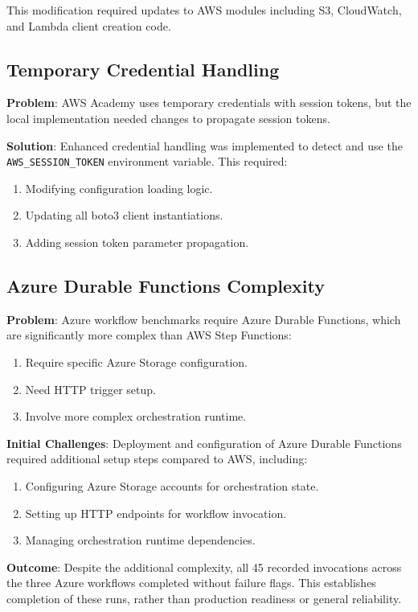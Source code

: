 \documentclass[sigconf,nonacm]{acmart}
\begin{document}
This modification required updates to AWS modules including S3, CloudWatch, and Lambda client creation code.

\subsection{Temporary Credential Handling}

\textbf{Problem}: AWS Academy uses temporary credentials with session tokens, but the local implementation needed changes to propagate session tokens.

\textbf{Solution}: Enhanced credential handling was implemented to detect and use the \texttt{AWS\_SESSION\_TOKEN} environment variable. This required:
\begin{enumerate}
    \item Modifying configuration loading logic.
    \item Updating all boto3 client instantiations.
    \item Adding session token parameter propagation.
\end{enumerate}

\subsection{Azure Durable Functions Complexity}

\textbf{Problem}: Azure workflow benchmarks require Azure Durable Functions, which are significantly more complex than AWS Step Functions:
\begin{enumerate}
    \item Require specific Azure Storage configuration.
    \item Need HTTP trigger setup.
    \item Involve more complex orchestration runtime.
\end{enumerate}

\textbf{Initial Challenges}: Deployment and configuration of Azure Durable Functions required additional setup steps compared to AWS, including:
\begin{enumerate}
    \item Configuring Azure Storage accounts for orchestration state.
    \item Setting up HTTP endpoints for workflow invocation.
    \item Managing orchestration runtime dependencies.
\end{enumerate}

\textbf{Outcome}: Despite the additional complexity, all 45 recorded invocations across the three Azure workflows completed without failure flags. This establishes completion of these runs, rather than production readiness or general reliability.
\end{document}
